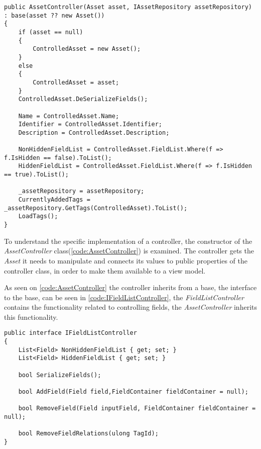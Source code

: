 \begin{listing}[H]
\begin{verbatim}
public AssetController(Asset asset, IAssetRepository assetRepository) : base(asset ?? new Asset())
{
    if (asset == null)
    {
        ControlledAsset = new Asset();
    }
    else
    {
        ControlledAsset = asset;
    }
    ControlledAsset.DeSerializeFields();

    Name = ControlledAsset.Name;
    Identifier = ControlledAsset.Identifier;
    Description = ControlledAsset.Description;
    
    NonHiddenFieldList = ControlledAsset.FieldList.Where(f => f.IsHidden == false).ToList();
    HiddenFieldList = ControlledAsset.FieldList.Where(f => f.IsHidden == true).ToList();
    
    _assetRepository = assetRepository;
    CurrentlyAddedTags = _assetRepository.GetTags(ControlledAsset).ToList();
    LoadTags();
}

\end{verbatim}
\label{code:AssetController}
\end{listing}

To understand the specific implementation of a controller, the constructor of the \textit{AssetController} class(\autoref{code:AssetController}) is examined. The controller gets the \textit{Asset} it needs to manipulate and connects its values to public properties of the controller class, in order to make them available to a view model. \par
As seen on \autoref{code:AssetController} the controller inherits from a base, the interface to the base, can be seen in \autoref{code:IFieldListController}, the \textit{FieldListController} contains the functionality related to controlling fields, the \textit{AssetController} inherits this functionality.

\begin{listing}[H]
\begin{verbatim}
public interface IFieldListController
{
    List<Field> NonHiddenFieldList { get; set; }
    List<Field> HiddenFieldList { get; set; }

    bool SerializeFields();

    bool AddField(Field field,FieldContainer fieldContainer = null);

    bool RemoveField(Field inputField, FieldContainer fieldContainer = null);

    bool RemoveFieldRelations(ulong TagId);
}
\end{verbatim}
\label{code:IFieldListController}
\end{listing}

